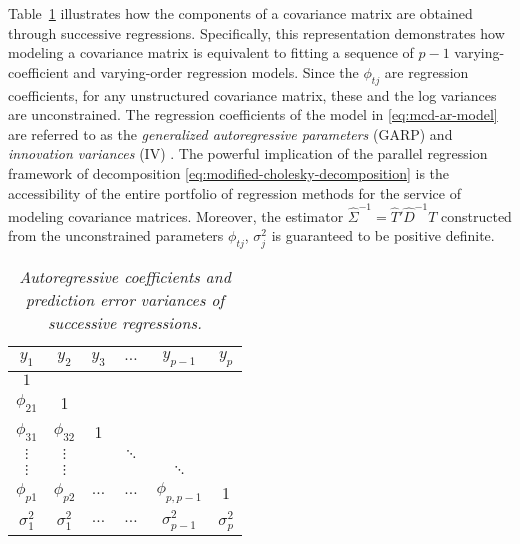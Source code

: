 Table~\ref{table:cholesky-decomposition-successive-regressions} illustrates how the components of a covariance matrix are obtained through successive regressions. Specifically, this representation demonstrates how modeling a covariance matrix is equivalent to fitting a sequence of $p - 1$ varying-coefficient and varying-order regression models. Since the $\phi_{tj}$ are regression coefficients, for any unstructured covariance matrix, these and the log variances are unconstrained. The regression coefficients of the model in \eqref{eq:mcd-ar-model} are referred to as the \textit{generalized autoregressive parameters} (GARP) and \textit{innovation variances} (IV) \citep{pourahmadi1999joint,pourahmadi2000maximum}. The powerful implication of the parallel regression framework of decomposition \eqref{eq:modified-cholesky-decomposition} is the accessibility of the entire portfolio of regression methods for the service of modeling covariance matrices. Moreover, the estimator $\hat{\Sigma}^{-1} = \hat{T}' \hat{D}^{-1} {T}$ constructed from the unconstrained parameters $\phi_{tj}$, $\sigma_j^2$ is guaranteed to be positive definite. 
\bigskip

\begin{table}[H]
\centering
\caption{\textit{Autoregressive coefficients and prediction error variances of successive regressions.}}
\begin{tabular}{cccccc}
 $y_{1}$&$y_{2}$ & $y_{3}$ & $\dots$ &$y_{p-1}$& $y_{p}$\\ \midrule
 $1$& &&&&\\
$\phi_{21}$& 1 &&&& \\
$\phi_{31}$& $\phi_{32}$& 1 &&& \\ 
$\vdots$ & $\vdots$ & & $\ddots$&& \\
$\vdots$ & $\vdots$ & && $\ddots$& \\
$\phi_{p1}$& $\phi_{p2}$&$\dots$ &$\dots$ &$\phi_{p,p-1}$ & 1\\ \midrule
$\sigma_1^2$ & $\sigma_1^2$ & $\dots$&$\dots$ &$\sigma_{p-1}^2$ &$\sigma_p^2$
\end{tabular} \label{table:cholesky-decomposition-successive-regressions}
\end{table}

